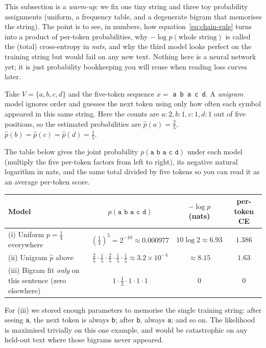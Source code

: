 This subsection is a \emph{warm-up}: we fix one tiny string and three toy
probability assignments (uniform, a frequency table, and a degenerate bigram
that memorises the string). The point is to see, in numbers, how
equation~\eqref{eq:chain-rule} turns into a product of per-token probabilities,
why \(-\log p(\text{whole string})\) is called the (total) cross-entropy in
\emph{nats}, and why the third model looks perfect on the training string but
would fail on any new text. Nothing here is a neural network yet; it is just
probability bookkeeping you will reuse when reading loss curves later.

Take \(V = \{a,b,c,d\}\) and the five-token sequence \(x =\) \texttt{a b a c d}.
A \emph{unigram} model ignores order and guesses the next token using only how
often each symbol appeared in this same string. Here the counts are
\(a{:}2, b{:}1, c{:}1, d{:}1\) out of five positions, so the estimated
probabilities are \(\hat p(a)=\frac{2}{5}\), \(\hat p(b)=\hat p(c)=\hat p(d)=\frac{1}{5}\).

The table below gives the joint probability \(p(\texttt{a b a c d})\) under each
model (multiply the five per-token factors from left to right), its negative
natural logarithm in nats, and the same total divided by five tokens so you can
read it as an average per-token score.

\begin{center}
\begin{tabular}{lccc}
\toprule
Model & \(p(\texttt{a b a c d})\) & \(-\log p\) (nats) & per-token CE \\
\midrule
(i) Uniform \(p=\frac14\) everywhere &
  \( (\frac14)^5 = 2^{-10}\approx 0.000977\) &
  \(10\log 2 \approx 6.93\) &
  \(1.386\) \\
(ii) Unigram \(\hat p\) above &
  \(\frac25\cdot\frac15\cdot\frac25\cdot\frac15\cdot\frac15 \approx 3.2\times 10^{-4}\) &
  \(\approx 8.15\) &
  \(1.63\) \\
(iii) Bigram fit \emph{only} on this sentence (zero elsewhere) &
  \(1\cdot\frac12\cdot 1\cdot 1\cdot 1\) &
  \(0\) &
  \(0\) \\
\bottomrule
\end{tabular}
\end{center}

For (iii) we stored enough parameters to memorise the single training string:
after seeing \texttt{a}, the next token is always \texttt{b}; after \texttt{b},
always \texttt{a}; and so on. The likelihood is maximised trivially on this one
example, and would be catastrophic on any held-out text where those bigrams
never appeared.

